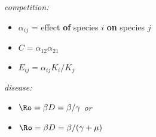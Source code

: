 \textsl{competition:}
\begin{itemize}
\item $\alpha_{ij}$ = effect \textbf{of} species $i$ \textbf{on} species $j$
\item $C = \alpha_{12}\alpha_{21}$
\item $E_{ij} = \alpha_{ij} K_i/K_j$
\end{itemize}

\textsl{disease:}
\begin{itemize}
\item $\Ro = \beta D = \beta/\gamma$ \emph{or}
\item $\Ro = \beta D = \beta/(\gamma+\mu)$ 
\end{itemize}
